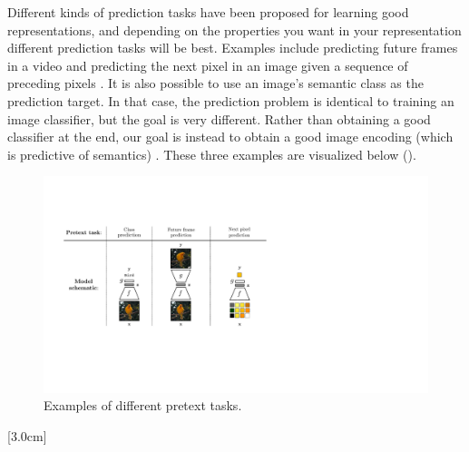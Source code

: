 Different kinds of prediction tasks have been proposed for learning good representations, and depending on the properties you want in your representation different prediction tasks will be best. Examples include predicting future frames in a video \cite{recasens2021broaden} and predicting the next pixel in an image given a sequence of preceding pixels \cite{chen2020generative}. It is also possible to use an image's semantic class as the prediction target. In that case, the prediction problem is identical to training an image classifier, but the goal is very different. Rather than obtaining a good classifier at the end, our goal is instead to obtain a good image encoding (which is predictive of semantics) \cite{donahue2014decafUSEdecafcitation}. These three examples are visualized below (\fig{\ref{fig:representation_learning:predictive_learning_examples}}).
\begin{figure}[h!]
    \centerline{
        \includegraphics[width=0.95\linewidth]{figures/representation_learning/predictive_learning_examples.pdf}
    }
  \caption{Examples of different pretext tasks.}
  \vspace{-1.0em}
  \label{fig:representation_learning:predictive_learning_examples}
\end{figure}
[3.0cm]

